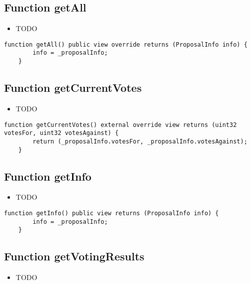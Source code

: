 \subsection{Function getAll}

\begin{itemize}
\item TODO
\end{itemize}

\begin{lstlisting}[firstnumber=168]
    function getAll() public view override returns (ProposalInfo info) {
        info = _proposalInfo;
    }
\end{lstlisting}

\subsection{Function getCurrentVotes}

\begin{itemize}
\item TODO
\end{itemize}

\begin{lstlisting}[firstnumber=181]
    function getCurrentVotes() external override view returns (uint32 votesFor, uint32 votesAgainst) {
        return (_proposalInfo.votesFor, _proposalInfo.votesAgainst);
    }
\end{lstlisting}

\subsection{Function getInfo}

\begin{itemize}
\item TODO
\end{itemize}

\begin{lstlisting}[firstnumber=177]
    function getInfo() public view returns (ProposalInfo info) {
        info = _proposalInfo;
    }
\end{lstlisting}

\subsection{Function getVotingResults}

\begin{itemize}
\item TODO
\end{itemize}

